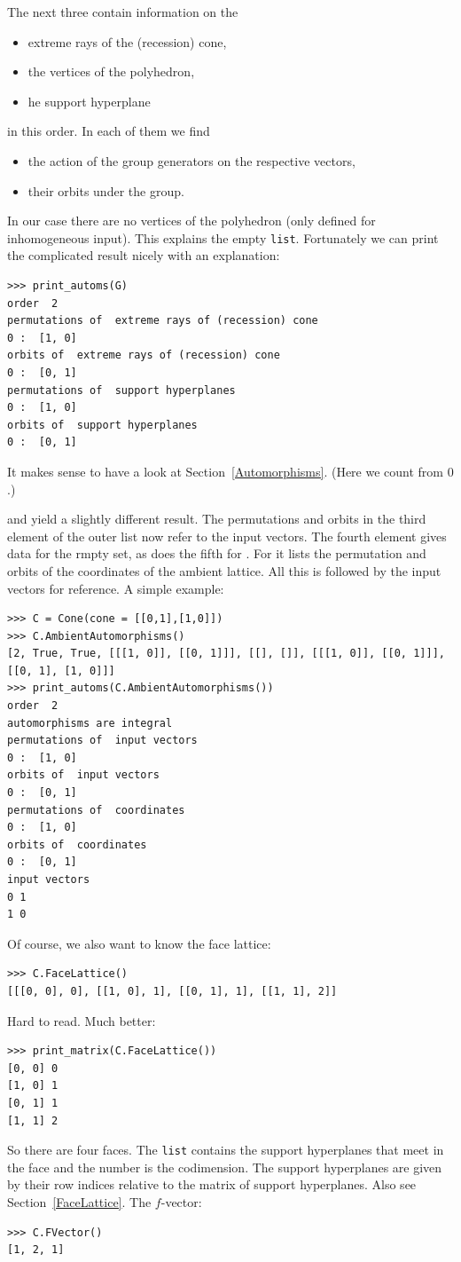 \begin{small}
The next three contain information on the
\begin{itemize}
	\item extreme rays of the (recession) cone,
	\item the vertices of the polyhedron,
	\item he support hyperplane
\end{itemize}
in this order. In each of them we find
\begin{itemize}
	\item the action of the group generators on the respective vectors,
	\item their orbits under the group.
\end{itemize}
In our case there are no vertices of the polyhedron (only defined for inhomogeneous input). This explains the empty \verb|list|. Fortunately we can print the complicated result nicely with an explanation:
\begin{Verbatim}
>>> print_automs(G)
order  2
permutations of  extreme rays of (recession) cone
0 :  [1, 0]
orbits of  extreme rays of (recession) cone
0 :  [0, 1]
permutations of  support hyperplanes
0 :  [1, 0]
orbits of  support hyperplanes
0 :  [0, 1]
\end{Verbatim}
It makes sense to have a look at Section~\ref{Automorphisms}. (Here we count from $0$.)

 and  yield a slightly different result. The permutations and orbits in the third element of the outer list now refer to the input vectors. The fourth element gives data for the rmpty set, as does the fifth for  . For  it lists the permutation and orbits of the coordinates of the ambient lattice. All this is followed by the input vectors for reference. A simple example:
\begin{Verbatim}
>>> C = Cone(cone = [[0,1],[1,0]])
>>> C.AmbientAutomorphisms()
[2, True, True, [[[1, 0]], [[0, 1]]], [[], []], [[[1, 0]], [[0, 1]]], [[0, 1], [1, 0]]]
>>> print_automs(C.AmbientAutomorphisms())
order  2
automorphisms are integral
permutations of  input vectors
0 :  [1, 0]
orbits of  input vectors
0 :  [0, 1]
permutations of  coordinates
0 :  [1, 0]
orbits of  coordinates
0 :  [0, 1]
input vectors
0 1
1 0
\end{Verbatim}
 
Of course, we also want to know the face lattice:
\begin{Verbatim}
>>> C.FaceLattice()
[[[0, 0], 0], [[1, 0], 1], [[0, 1], 1], [[1, 1], 2]]
\end{Verbatim}
Hard to read. Much better:
\begin{Verbatim}
>>> print_matrix(C.FaceLattice())
[0, 0] 0
[1, 0] 1
[0, 1] 1
[1, 1] 2
\end{Verbatim}
So there are four faces. The \verb|list| contains the support hyperplanes that meet in the face and the number is the codimension. The support hyperplanes are given by their row indices relative to the matrix of support hyperplanes. Also see Section~\ref{FaceLattice}. The $f$-vector:
\begin{Verbatim}
>>> C.FVector()
[1, 2, 1]
\end{Verbatim}


\end{small}
